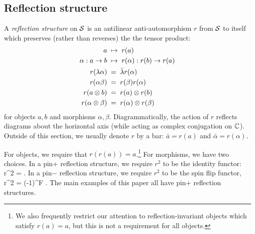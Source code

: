 \subsection{Reflection structure} \label{reflection_ss}

A {\it reflection structure} on $\mathcal{S}$ is an antilinear anti-automorphism $r$ from $\mathcal{S}$ to itself which preserves (rather than reverses) 
the the tensor product:
\begin{align}
	a & \; \mapsto \; r(a) \\
	\alpha: a\to b & \; \mapsto \; r(\alpha): r(b) \to r(a) \\
	r(\lambda \alpha) & \;=\;  \bar\lambda r(\alpha) \\
	r(\alpha\beta) & \;=\; r(\beta)r(\alpha) \\
	r(a\otimes b) & \;=\;  r(a) \otimes r(b) \\
	r(\alpha\otimes \beta) & \;=\;  r(\alpha) \otimes r(\beta)
\end{align}
for objects $a,b$ and morphisms $\alpha,\beta$. Diagrammatically, the action of  $r$ 
reflects diagrams about the horizontal axis (while acting as complex conjugation on $\mathbb{C}$). 
Outside of this section, we usually denote $r$ by a bar: $\bar a = r(a)$ and $\bar\alpha = r(\alpha)$.

For objects, we require that $r(r(a)) = a$.\footnote{
We also frequently restrict our attention to reflection-invariant objects which satisfy
$r(a) = a$, but this is not a requirement for all objects.}
For morphisms, we have two choices.
In a pin+ reflection structure, we require $r^2$ to be the identity functor:
\be
	r^2 = \id .
\ee
In a pin$-$ reflection structure, we require $r^2$ to be the spin flip functor,
\be
	r^2 = (-1)^F .
\ee
The main examples of this paper all have pin+ reflection structures.

